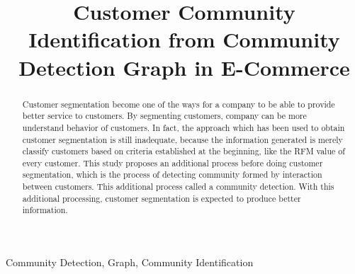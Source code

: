 \documentclass[conference]{IEEEtran}
\begin{document}
%
\title{Customer Community Identification from Community Detection Graph in E-Commerce}


\author{
\and
{}
}

\maketitle


\begin{abstract}
Customer segmentation become one of  the ways for a company to be able to provide better service to customers. By segmenting customers, company can be more understand behavior of customers. In fact, the approach which has been used to obtain customer segmentation is still inadequate, because the information generated is merely classify customers based on criteria established at the beginning, like the RFM value of every customer. This study proposes an additional process before doing customer segmentation, which is the process of detecting  community formed by interaction between customers. This additional process called a community detection. With this additional processing, customer segmentation is expected to produce better information.
\end{abstract}

\begin{IEEEkeywords}
Community Detection, Graph, Community Identification
\end{IEEEkeywords}
\end{document}
